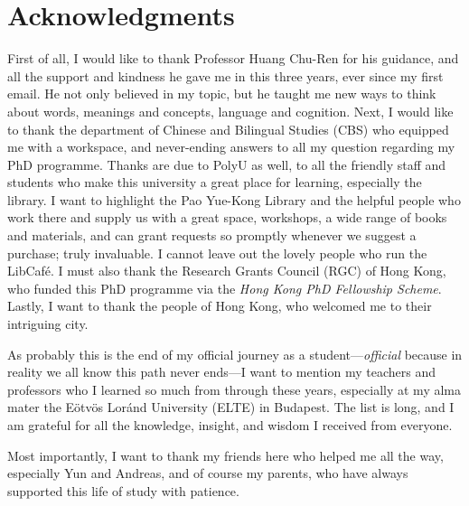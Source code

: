 \chapter*{Acknowledgments}
\label{ch:acknowledgments}


First of all, I would like to thank Professor Huang Chu-Ren for his guidance, and all the support and kindness he gave me in this three years, ever since my first email. He not only believed in my topic, but he taught me new ways to think about words, meanings and concepts, language and cognition. Next, I would like to thank the department of Chinese and Bilingual Studies (CBS) who equipped me with a workspace, and never-ending answers to all my question regarding my PhD programme. Thanks are due to PolyU as well, to all the friendly staff and students who make this university a great place for learning, especially the library. I want to highlight the Pao Yue-Kong Library and the helpful people who work there and supply us with a great space, workshops, a wide range of books and materials, and can grant requests so promptly whenever we suggest a purchase; truly invaluable. I cannot leave out the lovely people who run the LibCafé. I must also thank the Research Grants Council (RGC) of Hong Kong, who funded this PhD programme via the \textit{Hong Kong PhD Fellowship Scheme}. Lastly, I want to thank the people of Hong Kong, who welcomed me to their intriguing city.


As probably this is the end of my official journey as a student---\textit{official} because in reality we all know this path never ends---I want to mention my teachers and professors who I learned so much from through these years, especially at my alma mater the Eötvös Loránd University (ELTE) in Budapest. The list is long, and I am grateful for all the knowledge, insight, and wisdom I received from everyone.


Most importantly, I want to thank my friends here who helped me all the way, especially Yun and Andreas, and of course my parents, who have always supported this life of study with patience.
